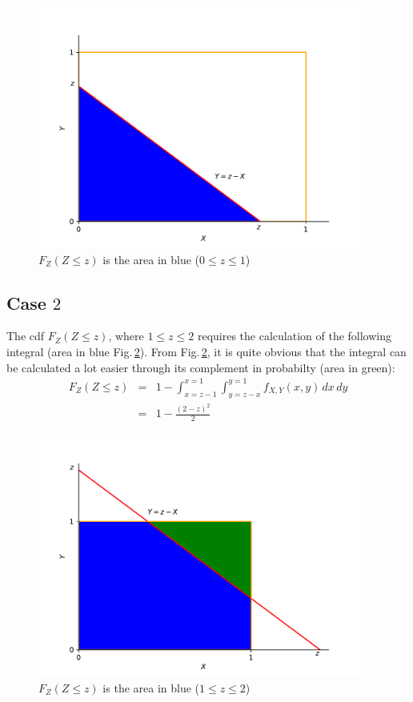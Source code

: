 \documentclass[12pt]{article}
\theoremstyle{definition}
\theoremstyle{remark}
\begin{document}
\begin{figure}[H]
   \centering
	\includegraphics[width=0.95\textwidth]{../img/case1.pdf}
	\caption{$F_Z(Z \le z)$ is the area in blue ($0 \le z \le 1$)}\label{case1}
\end{figure}

\subsection*{Case $2$}
The cdf $F_Z(Z\le z)$, where $1\le z \le 2$ requires 
the calculation of the following integral (area in blue Fig.\,\ref{case2}). From Fig.\,\ref{case2}, it is quite obvious 
that the integral can be calculated a lot easier through its complement in probabilty (area in green):
\begin{eqnarray}
	\displaystyle F_Z(Z \le z) &= & 1 - \int_{x=z-1}^{x=1} \int_{y=z-x}^{y=1} f_{X,Y}(x,y)\,dx\,dy \nonumber \\
	      & =& 1-\frac{(2-z)^2}{2} \nonumber
\end{eqnarray} 



\begin{figure}[H]
   \centering
        \includegraphics[width=0.95\textwidth]{../img/case2.pdf}
        \caption{$F_Z(Z \le z)$ is the area in blue ($1 \le z \le 2$)}\label{case2}
\end{figure}
\end{document}
